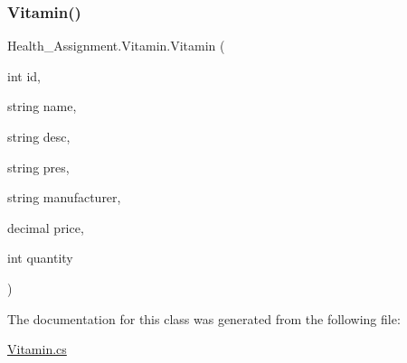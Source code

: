 \subsubsection{\texorpdfstring{Vitamin()}{Vitamin()}\hspace{0.1cm}{\footnotesize\ttfamily [3/3]}}
{\footnotesize\ttfamily Health\+\_\+\+Assignment.\+Vitamin.\+Vitamin (\begin{DoxyParamCaption}\item[{int}]{id,  }\item[{string}]{name,  }\item[{string}]{desc,  }\item[{string}]{pres,  }\item[{string}]{manufacturer,  }\item[{decimal}]{price,  }\item[{int}]{quantity }\end{DoxyParamCaption})\hspace{0.3cm}{\ttfamily [inline]}}



The documentation for this class was generated from the following file\+:\begin{DoxyCompactItemize}
\item 
\hyperlink{_vitamin_8cs}{Vitamin.\+cs}\end{DoxyCompactItemize}
